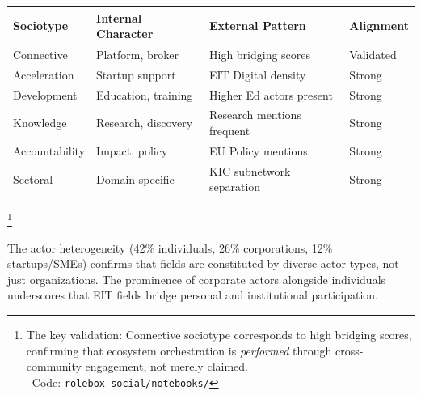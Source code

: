 \documentclass[../main.tex]{subfiles}
\begin{document}
\begin{center}
\small
\begin{tabular}{llll}
\toprule
\textbf{Sociotype} & \textbf{Internal Character} & \textbf{External Pattern} & \textbf{Alignment} \\
\midrule
Connective & Platform, broker & High bridging scores & Validated \\
Acceleration & Startup support & EIT Digital density & Strong \\
Development & Education, training & Higher Ed actors present & Strong \\
Knowledge & Research, discovery & Research mentions frequent & Strong \\
Accountability & Impact, policy & EU Policy mentions & Strong \\
Sectoral & Domain-specific & KIC subnetwork separation & Strong \\
\bottomrule
\end{tabular}
\end{center}

\footnote{The key validation: Connective sociotype corresponds to high bridging scores, confirming that ecosystem orchestration is \textit{performed} through cross-community engagement, not merely claimed.\\\iconcode\ Code: \texttt{rolebox-social/notebooks/}}

\begin{center}
\end{center}

The actor heterogeneity (42\% individuals, 26\% corporations, 12\% startups/SMEs) confirms that fields are constituted by diverse actor types, not just organizations. The prominence of corporate actors alongside individuals underscores that EIT fields bridge personal and institutional participation.
\end{document}
